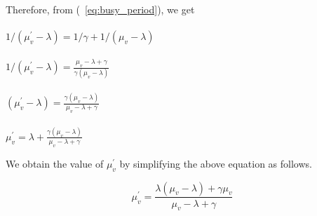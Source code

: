 \documentclass[letter,9pt, twocolumn]{article}
\begin{document}
Therefore, from (~\ref{eq:busy_period}), we get \\ \\
$1/(\mu_v^{'} - \lambda) = 1/\gamma + 1/(\mu_v - \lambda)$ \\ \\
$1/(\mu_v^{'} - \lambda) = \frac{\mu_v - \lambda + \gamma}{\gamma (\mu_v - \lambda)}$ \\ \\
$(\mu_v^{'} - \lambda) = \frac{\gamma (\mu_v - \lambda)}{\mu_v - \lambda + \gamma}$ \\ \\
$\mu_v^{'}  = \lambda + \frac{\gamma (\mu_v - \lambda)}{\mu_v - \lambda + \gamma}$ 

We obtain the value of $\mu_v^{'}$ by simplifying the above equation as follows.

\begin{equation}
\mu_v^{'} = \frac{\lambda(\mu_v - \lambda) + \gamma \mu_v}{\mu_v - \lambda + \gamma}
\label{eq:mu_v_prime}
\end{equation}
\end{document}
